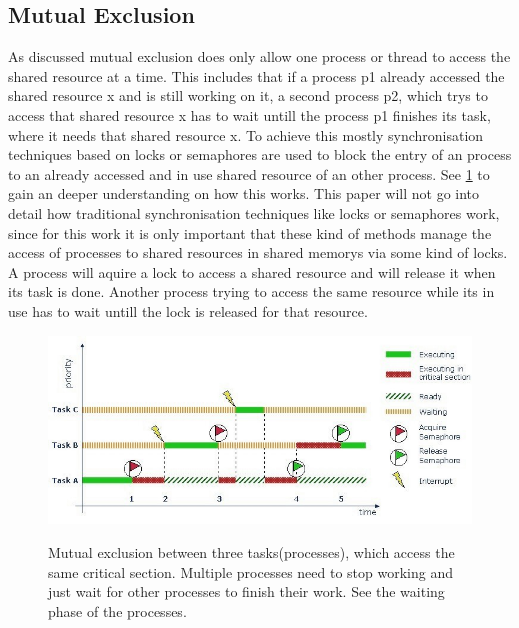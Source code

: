 \subsection{Mutual Exclusion}\label{subsec:mutual-exclusion}

As discussed mutual exclusion does only allow one process or thread to access the shared resource at a time. This includes that if a process p1 already accessed the shared resource x and is still working on it, a second process p2, which trys to access that shared resource x has to wait untill the process p1 finishes its task, where it needs that shared resource x. To achieve this mostly synchronisation techniques based on locks or semaphores are used to block the entry of an process to an already accessed and in use shared resource of an other process. See \cref{fig:mutual-exclusion} to gain an deeper understanding on how this works. This paper will not go into detail how traditional synchronisation techniques like locks or semaphores work, since for this work it is only important that these kind of methods manage the access of processes to shared resources in shared memorys via some kind of locks. A process will aquire a lock to access a shared resource and will release it when its task is done. Another process trying to access the same resource while its in use has to wait untill the lock is released for that resource.

\begin{figure}[!ht]
    \centering
    \captionsetup{justification=centering}
    \caption{Mutual exclusion between three tasks(processes), which access the same critical section. Multiple processes need to stop working and just wait for other processes to finish their work. See the waiting phase of the processes.}
    \includegraphics[width=135mm]{images/mutual_exclusion.jpg}
    \cite{MutualExclusion}
    \label{fig:mutual-exclusion}
\end{figure}

